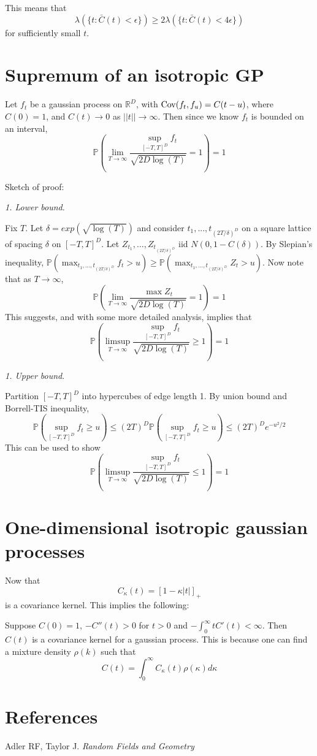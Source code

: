 \documentclass[11pt]{article}
\begin{document}
This means that
\[
\lambda(\{t: \bar{C}(t) < \epsilon\}) \geq 2\lambda(\{t: \bar{C}(t) < 4\epsilon\})
\]
for sufficiently small $t$.

\section{Supremum of an isotropic GP}

Let $f_t$ be a gaussian process on $\mathbb{R}^D$, with $\text{Cov}(f_t,f_u)
= C(t-u)$, where $C(0) = 1$, and $C(t) \to 0$ as $||t|| \to \infty$.
Then since we know $f_t$ is bounded on an interval,
\[
\mathbb{P}\left(\lim_{T \to \infty}\frac{\sup_{[-T,T]^D}
    f_t}{\sqrt{2D\log(T)}} = 1
\right) = 1
\]

Sketch of proof:

\emph{1. Lower bound}.

Fix $T$. Let $\delta =exp(\sqrt{\log(T)})$ and consider
$t_1,...,t_{(2T/\delta)^D}$ on a square lattice of spacing $\delta$ on
$[-T,T]^D$.  Let $Z_{t_1},\hdots, Z_{t_{(2T/\delta)^D}}$ iid
$N(0,1-C(\delta))$.  By Slepian's inequality,
$\mathbb{P}(\max_{t_1,\hdots,t_{(2T/\delta)^D}} f_t > u) \geq
\mathbb{P}(\max_{t_1,\hdots,t_{(2T/\delta)^D}} Z_t > u)$.  Now note
that as $T \to \infty$, 
\[
\mathbb{P}\left(\lim_{T \to \infty}\frac{\max
    Z_t}{\sqrt{2D\log(T)}} = 1
\right) = 1
\]
This suggests, and with some more detailed analysis, implies that
\[
\mathbb{P}\left(\limsup_{T \to \infty}\frac{\sup_{[-T,T]^D}
    f_t}{\sqrt{2D\log(T)}} \geq 1
\right) = 1
\]

\emph{1. Upper bound}.

Partition $[-T,T]^D$ into hypercubes of edge length 1.
By union bound and Borrell-TIS inequality,
\[\mathbb{P}(\sup_{[-T,T]^D} f_t \geq u) \leq (2T)^D
\mathbb{P}(\sup_{[-T,T]^D} f_t \geq u) \leq (2T)^D e^{-u^2/2}\]
This can be used to show
\[
\mathbb{P}\left(\limsup_{T \to \infty}\frac{\sup_{[-T,T]^D}
    f_t}{\sqrt{2D\log(T)}} \leq 1
\right) = 1
\]

\section{One-dimensional isotropic gaussian processes}

Now that 
\[
C_\kappa(t) = [1-\kappa|t|]_+
\]
is a covariance kernel. This implies the following:

Suppose $C(0) = 1$, $-C''(t) > 0$ for $t > 0$ and $-\int_0^\infty t
C'(t) <\infty$.
Then $C(t)$ is a covariance kernel for a gaussian process.
This is because one can find a mixture density $\rho(k)$ such that
\[
C(t) = \int_0^\infty C_\kappa(t) \rho(\kappa) d\kappa
\]



\section{References}

Adler RF, Taylor J. \emph{Random Fields and Geometry}
\end{document}
